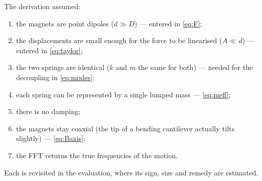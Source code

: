 \documentclass[11pt,a4paper]{article}
\begin{document}
The derivation assumed:
\begin{enumerate}[label=(\alph*),nosep,leftmargin=2em]
\item the magnets are point dipoles ($d\gg D$) --- entered in \eqref{eq:F};
\item the displacements are small enough for the force to be linearised ($A\ll d$) --- entered in \eqref{eq:taylor};
\item the two springs are identical ($k$ and $m$ the same for both) --- needed for the decoupling in \eqref{eq:modes};
\item each spring can be represented by a single lumped mass --- \eqref{eq:meff};
\item there is no damping;
\item the magnets stay coaxial (the tip of a bending cantilever actually tilts slightly) --- \eqref{eq:Baxis};
\item the FFT returns the true frequencies of the motion.
\end{enumerate}
Each is revisited in the evaluation, where its sign, size and remedy are estimated.
\end{document}
